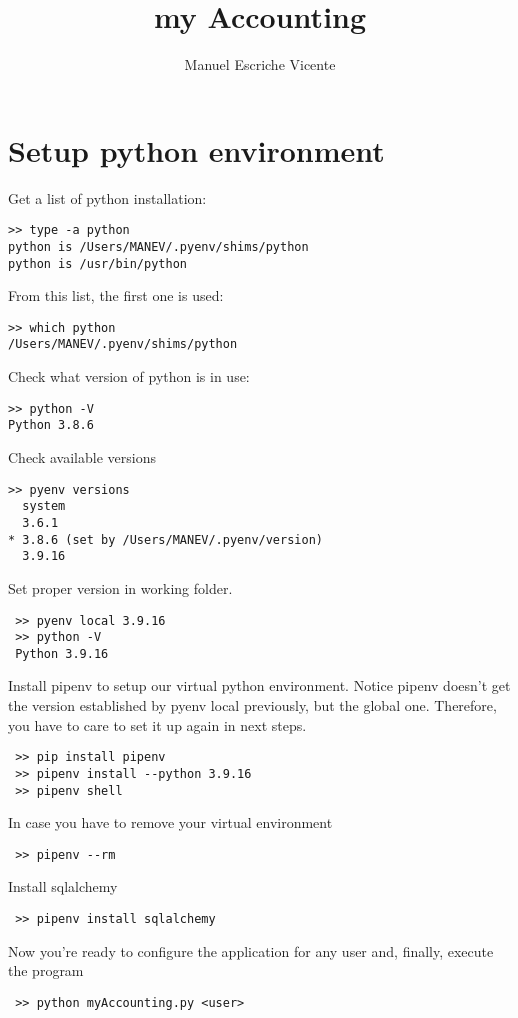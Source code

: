 \documentclass[12pt, a4paper]{article}
\title{my Accounting}
\author{Manuel Escriche Vicente}
\begin{document}
\maketitle
\begin{abstract}

\end{abstract}
\tableofcontents
\newpage

\section{Setup python environment}
Get a list of python installation:
\begin{verbatim}
>> type -a python
python is /Users/MANEV/.pyenv/shims/python
python is /usr/bin/python
\end{verbatim}
From this list, the first one is used:
\begin{verbatim}
>> which python
/Users/MANEV/.pyenv/shims/python
\end{verbatim}
Check what version of python is in use:
\begin{verbatim}
>> python -V
Python 3.8.6
\end{verbatim}
Check available versions
\begin{verbatim}
>> pyenv versions
  system
  3.6.1
* 3.8.6 (set by /Users/MANEV/.pyenv/version)
  3.9.16
\end{verbatim}
Set proper version in working folder.  
\begin{verbatim}
 >> pyenv local 3.9.16
 >> python -V 
 Python 3.9.16
 \end{verbatim}
 Install pipenv to setup our virtual python environment. Notice pipenv doesn't get the version established by pyenv local previously, but the global one. Therefore, you have to care to set it up again in next steps.
 \begin{verbatim}
 >> pip install pipenv
 >> pipenv install --python 3.9.16
 >> pipenv shell
 \end{verbatim}
 In case you have to remove your virtual environment 
 \begin{verbatim}
 >> pipenv --rm
 \end{verbatim}
 Install sqlalchemy
 \begin{verbatim}
 >> pipenv install sqlalchemy
 \end{verbatim}
 Now you're ready to configure the application for any user 
 and, finally, execute the program
 \begin{verbatim}
 >> python myAccounting.py <user>
 \end{verbatim} 
 
\end{document}

